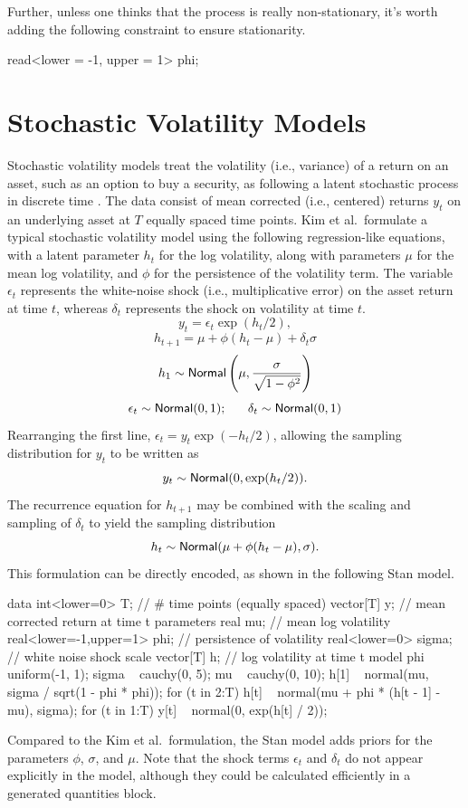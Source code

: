 Further, unless one thinks that the process is really non-stationary,
it's worth adding the following constraint to ensure stationarity.
%
\begin{stancode}
read<lower = -1, upper = 1> phi;
\end{stancode} 



\section{Stochastic Volatility Models}

Stochastic volatility models treat the volatility (i.e., variance) of
a return on an asset, such as an option to buy a security, as
following a latent stochastic process in discrete time
\citep{KimShephardChib:1998}.  The data consist of mean corrected
(i.e., centered) returns $y_t$ on an underlying asset at $T$ equally
spaced time points.  Kim et al.\ formulate a typical stochastic
volatility model using the following regression-like equations, with a
latent parameter $h_t$ for the log volatility, along with parameters
$\mu$ for the mean log volatility, and $\phi$ for the persistence of
the volatility term.  The variable $\epsilon_t$ represents the
white-noise shock (i.e., multiplicative error) on the asset return at
time $t$, whereas $\delta_t$ represents the shock on volatility at
time $t$.
\[
y_t = \epsilon_t \exp(h_t / 2),
\]
\[
h_{t+1} = \mu + \phi (h_t - \mu) + \delta_t \sigma
\]
\[
h_1 \sim \distro{Normal}\left( \mu, \frac{\sigma}{\sqrt{1 - \phi^2}} \right)
\]
\[
\epsilon_t \sim \distro{Normal}(0,1); \ \ \ \ \  \delta_t \sim \distro{Normal}(0,1)
\]
%
Rearranging the first line, $\epsilon_t = y_t \exp(-h_t / 2)$,
allowing the sampling distribution for $y_t$ to be written as
\[ 
y_t \sim \distro{Normal}(0,\exp(h_t/2)).
\]
The recurrence equation for $h_{t+1}$ may be combined with the
scaling and sampling of $\delta_t$ to yield the sampling distribution
\[
h_t \sim \distro{Normal}(\mu + \phi(h_t - \mu), \sigma).
\]
This formulation can be directly encoded, as shown in the following
Stan model.
%
\begin{stancode}
data {
  int<lower=0> T;   // # time points (equally spaced)
  vector[T] y;      // mean corrected return at time t
}
parameters {
  real mu;                     // mean log volatility
  real<lower=-1,upper=1> phi;  // persistence of volatility
  real<lower=0> sigma;         // white noise shock scale
  vector[T] h;                 // log volatility at time t
}
model {
  phi ~ uniform(-1, 1);
  sigma ~ cauchy(0, 5);
  mu ~ cauchy(0, 10);  
  h[1] ~ normal(mu, sigma / sqrt(1 - phi * phi));
  for (t in 2:T)
    h[t] ~ normal(mu + phi * (h[t - 1] -  mu), sigma);
  for (t in 1:T)
    y[t] ~ normal(0, exp(h[t] / 2));
}
\end{stancode}
%
Compared to the Kim et al.\ formulation, the Stan model adds priors
for the parameters $\phi$, $\sigma$, and $\mu$.  Note that the shock
terms $\epsilon_t$ and $\delta_t$ do not appear explicitly in the
model, although they could be calculated efficiently in a generated
quantities block.

